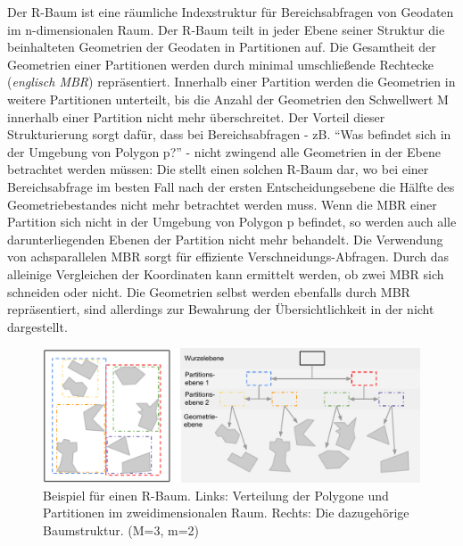 \documentclass[runningheads,a4paper]{llncs}
\begin{document}
	Der R-Baum ist eine räumliche Indexstruktur für Bereichsabfragen von Geodaten im n-dimensionalen Raum. Der R-Baum teilt in jeder Ebene seiner Struktur die beinhalteten Geometrien der Geodaten in Partitionen auf. Die Gesamtheit der Geometrien einer Partitionen werden durch minimal umschließende Rechtecke (\emph{englisch \ac{MBR}}) repräsentiert.
	Innerhalb einer Partition werden die Geometrien in weitere Partitionen unterteilt, bis die Anzahl der Geometrien den Schwellwert \acs{M} innerhalb einer Partition nicht mehr überschreitet. Der Vorteil dieser Strukturierung sorgt dafür, dass bei Bereichsabfragen - zB. \enquote{Was befindet sich in der Umgebung von Polygon p?} - nicht zwingend alle Geometrien in der Ebene betrachtet werden müssen: Die  stellt einen solchen R-Baum dar, wo bei einer Bereichsabfrage im besten Fall nach der ersten Entscheidungsebene die Hälfte des Geometriebestandes nicht mehr betrachtet werden muss. Wenn die \acs{MBR} einer Partition sich nicht in der Umgebung von Polygon p befindet, so werden auch alle darunterliegenden Ebenen der Partition nicht mehr behandelt. Die Verwendung von achsparallelen \acs{MBR} sorgt für effiziente Verschneidungs-Abfragen. Durch das alleinige Vergleichen der Koordinaten kann ermittelt werden, ob zwei \acs{MBR} sich schneiden oder nicht. Die Geometrien selbst werden ebenfalls durch \acs{MBR} repräsentiert, sind allerdings zur Bewahrung der Übersichtlichkeit in der  nicht dargestellt.
	\begin{figure}[H]
		\begin{center}
		\includegraphics[width=1.0\textwidth ]{001_Beispiel_R-Tree.pdf}
		\caption{Beispiel für einen R-Baum. Links: Verteilung der Polygone und Partitionen im zweidimensionalen Raum. Rechts: Die dazugehörige Baumstruktur. (\acs{M}=3, \acs{m}=2)}
		\label{fig:beispiel-r-tree}
		\end{center}
	\end{figure}
\end{document}
